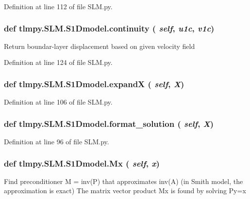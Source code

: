 Definition at line 112 of file SLM.py.\hypertarget{classtlmpy_1_1SLM_1_1S1Dmodel_ae02728f74162fbce084fbda0c0af2135}{
\subsubsection[{continuity}]{\setlength{\rightskip}{0pt plus 5cm}def tlmpy.SLM.S1Dmodel.continuity ( {\em self}, \/   {\em u1c}, \/   {\em v1c})}}
\label{classtlmpy_1_1SLM_1_1S1Dmodel_ae02728f74162fbce084fbda0c0af2135}
\begin{DoxyVerb}Return boundar-layer displacement based on given velocity field\end{DoxyVerb}
 

Definition at line 124 of file SLM.py.\hypertarget{classtlmpy_1_1SLM_1_1S1Dmodel_a40bdb785666c9209ca85bffeaeeb54c1}{
\subsubsection[{expandX}]{\setlength{\rightskip}{0pt plus 5cm}def tlmpy.SLM.S1Dmodel.expandX ( {\em self}, \/   {\em X})}}
\label{classtlmpy_1_1SLM_1_1S1Dmodel_a40bdb785666c9209ca85bffeaeeb54c1}


Definition at line 106 of file SLM.py.\hypertarget{classtlmpy_1_1SLM_1_1S1Dmodel_a26c24ee375b2ac3e442a3f7055815131}{
\subsubsection[{format\_\-solution}]{\setlength{\rightskip}{0pt plus 5cm}def tlmpy.SLM.S1Dmodel.format\_\-solution ( {\em self}, \/   {\em X})}}
\label{classtlmpy_1_1SLM_1_1S1Dmodel_a26c24ee375b2ac3e442a3f7055815131}


Definition at line 96 of file SLM.py.\hypertarget{classtlmpy_1_1SLM_1_1S1Dmodel_af10d3c6e4ed1798894ba140c5532c081}{
\subsubsection[{Mx}]{\setlength{\rightskip}{0pt plus 5cm}def tlmpy.SLM.S1Dmodel.Mx ( {\em self}, \/   {\em x})}}
\label{classtlmpy_1_1SLM_1_1S1Dmodel_af10d3c6e4ed1798894ba140c5532c081}
\begin{DoxyVerb}
Find preconditioner M = inv(P) that approximates inv(A)
(in Smith model, the approximation is exact)
The matrix vector product Mx is found by solving Py=x
\end{DoxyVerb}
 


